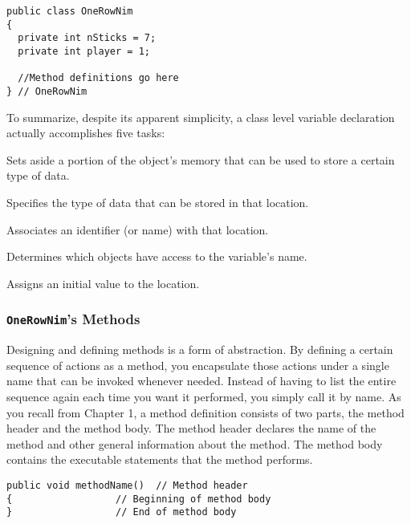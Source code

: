 \begin{jjjlisting}
\begin{lstlisting}
public class OneRowNim
{
  private int nSticks = 7;
  private int player = 1;

  //Method definitions go here
} // OneRowNim
\end{lstlisting}
\end{jjjlisting}

To summarize, despite its apparent simplicity, a class level variable
declaration actually accomplishes five tasks:

\begin{NL}
\item  Sets aside a portion of the object's memory that can be used
to store a certain type of data.

\item  Specifies the type of data that can be stored in that location.

\item  Associates an identifier (or name) with that location.

\item  Determines which objects have access to the variable's name.

\item  Assigns an initial value to the location.
\end{NL}


\subsubsection*{{\tt\bf OneRowNim}'s Methods}

\noindent Designing and defining methods is a form of abstraction.
By defining a certain sequence of actions as a method, you encapsulate
those actions under a single name that can be invoked whenever needed.
Instead of having to list the entire sequence again each time you want
it performed, you simply call it by name.  As you recall from Chapter
1, a method definition consists of two parts, the method header and
the method body. The method header declares the name of the method and
other general information about the method. The method body contains
the executable statements that the method performs.
\begin{jjjlisting}
\begin{lstlisting}
public void methodName()  // Method header
{                  // Beginning of method body
}                  // End of method body
\end{lstlisting}
\end{jjjlisting}

